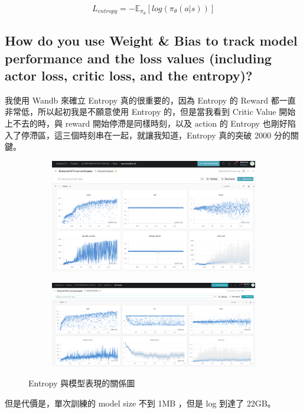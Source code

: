\begin{equation}
    L_{entropy} = -\mathbb{E}_{\pi_\theta}[log(\pi_\theta(a|s))]
\end{equation}


\subsection{How do you use Weight \& Bias to track model performance and the loss values (including actor loss, critic loss, and the entropy)?}


我使用 Wandb 來確立 Entropy 真的很重要的，因為 Entropy 的 Reward 都一直非常低，所以起初我是不願意使用 Entropy 的，但是當我看到 Critic Value 開始上不去的時，與 reward 開始停滯是同樣時刻，以及 action 的 Entropy 也剛好陷入了停滯區，這三個時刻串在一起，就讓我知道，Entropy 真的突破 2000 分的關鍵。

\begin{figure}[h]
    \centering
    \begin{subfigure}[b]{0.8\textwidth}
        \centering
        \includegraphics[width=\textwidth]{figures/wandb_case1.png}
        \label{fig:wandb_case1}
    \end{subfigure}
    \hfill
    \begin{subfigure}[b]{0.8\textwidth}
        \centering
        \includegraphics[width=\textwidth]{figures/wandb_case2.png}
        \label{fig:wandb_case2}
    \end{subfigure}
    \caption{Entropy 與模型表現的關係圖}
    \label{fig:wandb_cases}
\end{figure}

但是代價是，單次訓練的 model size 不到 1MB ，但是 log 到達了 22GB。